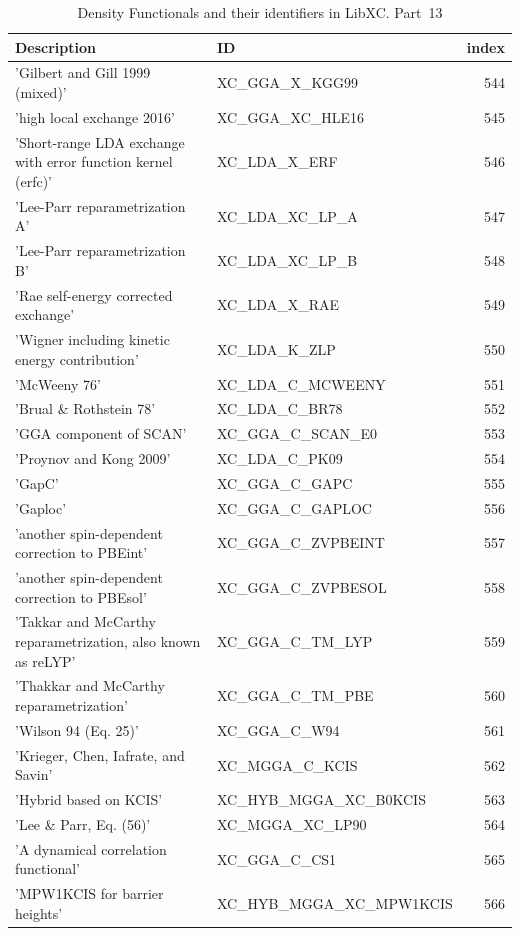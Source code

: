 \documentclass[final,12pt,makeidx,DIV=calc]{article}
\begin{document}
{{{{{{\begin{table}[!h]
\caption{Density Functionals and their identifiers in LibXC. Part~13}
\begin{center}
\begin{tabular}{llr}
\hline
\hline
Description & ID & index\\
\hline
  'Gilbert and Gill 1999 (mixed)' & XC\_GGA\_X\_KGG99  &544\\
  'high local exchange 2016' & XC\_GGA\_XC\_HLE16  &545\\
  'Short-range LDA exchange with error function kernel (erfc)' & XC\_LDA\_X\_ERF  &546\\
  'Lee-Parr reparametrization A' & XC\_LDA\_XC\_LP\_A  &547\\
  'Lee-Parr reparametrization B' & XC\_LDA\_XC\_LP\_B  &548\\
  'Rae self-energy corrected exchange' & XC\_LDA\_X\_RAE  &549\\
  'Wigner including kinetic energy contribution' & XC\_LDA\_K\_ZLP  &550\\
  'McWeeny 76' & XC\_LDA\_C\_MCWEENY  &551\\
  'Brual \& Rothstein 78' & XC\_LDA\_C\_BR78  &552\\
  'GGA component of SCAN' & XC\_GGA\_C\_SCAN\_E0  &553\\
  'Proynov and Kong 2009' & XC\_LDA\_C\_PK09  &554\\
  'GapC' & XC\_GGA\_C\_GAPC  &555\\
  'Gaploc' & XC\_GGA\_C\_GAPLOC  &556\\
  'another spin-dependent correction to PBEint' & XC\_GGA\_C\_ZVPBEINT  &557\\
  'another spin-dependent correction to PBEsol' & XC\_GGA\_C\_ZVPBESOL  &558\\
  'Takkar and McCarthy reparametrization, also known as reLYP' & XC\_GGA\_C\_TM\_LYP  &559\\
  'Thakkar and McCarthy reparametrization' & XC\_GGA\_C\_TM\_PBE  &560\\
  'Wilson 94 (Eq. 25)' & XC\_GGA\_C\_W94  &561\\
  'Krieger, Chen, Iafrate, and Savin' & XC\_MGGA\_C\_KCIS  &562\\
  'Hybrid based on KCIS' & XC\_HYB\_MGGA\_XC\_B0KCIS  &563\\
  'Lee \& Parr, Eq. (56)' & XC\_MGGA\_XC\_LP90  &564\\
  'A dynamical correlation functional' & XC\_GGA\_C\_CS1  &565\\
  'MPW1KCIS for barrier heights' & XC\_HYB\_MGGA\_XC\_MPW1KCIS  &566\\

\end{tabular}
\end{center}
\end{table}}}}}}}
\end{document}
